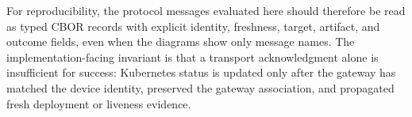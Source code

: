 For reproducibility, the protocol messages evaluated here should therefore be read as typed CBOR records with explicit identity, freshness, target, artifact, and outcome fields, even when the diagrams show only message names. The implementation-facing invariant is that a transport acknowledgment alone is insufficient for success: Kubernetes status is updated only after the gateway has matched the device identity, preserved the gateway association, and propagated fresh deployment or liveness evidence.

